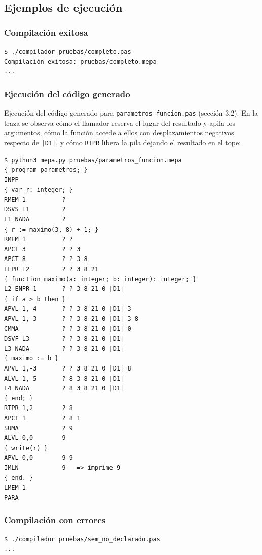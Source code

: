 \documentclass[12pt]{article}
\begin{document}
\subsection{Ejemplos de ejecución}

\subsubsection*{Compilación exitosa}
\begin{lstlisting}[frame=single, basicstyle=\ttfamily\small]
$ ./compilador pruebas/completo.pas
Compilación exitosa: pruebas/completo.mepa
...
\end{lstlisting}

\subsubsection*{Ejecución del código generado}
Ejecución del código generado para \texttt{parametros\_funcion.pas} (sección 3.2). En la traza se observa cómo el llamador reserva el lugar del resultado y apila los argumentos, cómo la función accede a ellos con desplazamientos negativos respecto de \texttt{|D1|}, y cómo \texttt{RTPR} libera la pila dejando el resultado en el tope:

\begin{lstlisting}[frame=single, basicstyle=\ttfamily\small, breaklines=true]
$ python3 mepa.py pruebas/parametros_funcion.mepa
{ program parametros; }
INPP
{ var r: integer; }
RMEM 1          ?
DSVS L1         ?
L1 NADA         ?
{ r := maximo(3, 8) + 1; }
RMEM 1          ? ?
APCT 3          ? ? 3
APCT 8          ? ? 3 8
LLPR L2         ? ? 3 8 21
{ function maximo(a: integer; b: integer): integer; }
L2 ENPR 1       ? ? 3 8 21 0 |D1|
{ if a > b then }
APVL 1,-4       ? ? 3 8 21 0 |D1| 3
APVL 1,-3       ? ? 3 8 21 0 |D1| 3 8
CMMA            ? ? 3 8 21 0 |D1| 0
DSVF L3         ? ? 3 8 21 0 |D1|
L3 NADA         ? ? 3 8 21 0 |D1|
{ maximo := b }
APVL 1,-3       ? ? 3 8 21 0 |D1| 8
ALVL 1,-5       ? 8 3 8 21 0 |D1|
L4 NADA         ? 8 3 8 21 0 |D1|
{ end; }
RTPR 1,2        ? 8
APCT 1          ? 8 1
SUMA            ? 9
ALVL 0,0        9
{ write(r) }
APVL 0,0        9 9
IMLN            9   => imprime 9
{ end. }
LMEM 1
PARA
\end{lstlisting}

\subsubsection*{Compilación con errores}
\begin{lstlisting}[frame=single, basicstyle=\ttfamily\small]
$ ./compilador pruebas/sem_no_declarado.pas
...
\end{lstlisting}
\end{document}
